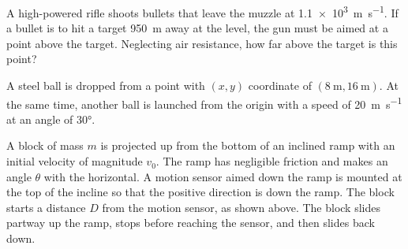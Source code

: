 \documentclass{../../../oss-classkick-exam}
\begin{document}
\begin{questions}
  \question A high-powered rifle shoots bullets that leave the muzzle at
  \SI{1.1e3}{\metre\per\second}. If a bullet is to hit a target
  \SI{950}{\metre} away at the level, the gun must be aimed at a point above
  the target. Neglecting air resistance, how far above the target is this
  point? 
  \newpage
  
  \question A steel ball is dropped from a point with $(x,y)$ coordinate of
  $(\SI{8}{\metre},\SI{16}{\metre})$. At the same time, another ball is launched
  from the origin with a speed of \SI{20}{\metre\per\second} at an angle of
  \ang{30}.
  \newpage


  \question A block of mass $m$ is projected up from the bottom of an inclined
  ramp with an initial velocity of magnitude $v_0$. The ramp has negligible
  friction and makes an angle $\theta$ with the horizontal. A motion sensor
  aimed down the ramp is mounted at the top of the incline so that the positive
  direction is down the ramp. The block starts a distance $D$ from the motion
  sensor, as shown above. The block slides partway up the ramp, stops before
  reaching the sensor, and then slides back down.
\end{questions}
\end{document}
